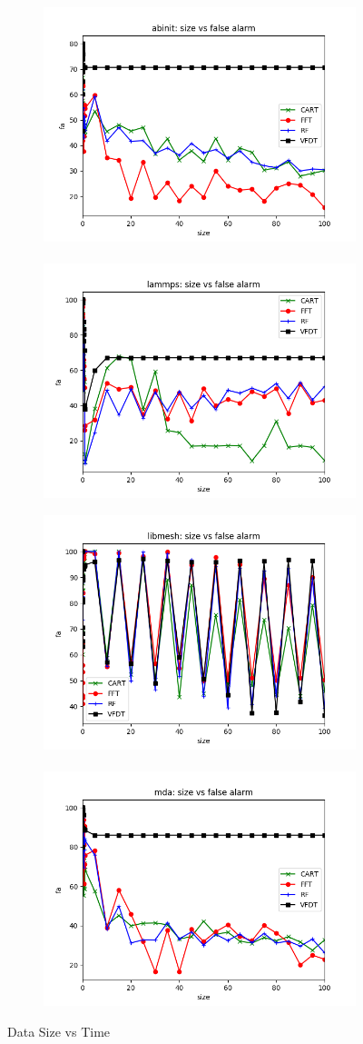 \documentclass[sigplan]{acmart}\settopmatter{printfolios=true,printccs=false,printacmref=false}
\begin{document}
\begin{figure}
	\centering
	\begin{subfigure}[b]{\linewidth}
		\includegraphics[width=.49\linewidth]{fig/abinit-size-fa.png} \ 
		\includegraphics[width=.49\linewidth]{fig/lammps-size-fa.png}
	\end{subfigure}
	\begin{subfigure}[b]{\linewidth}
		\includegraphics[width=.49\linewidth]{fig/libmesh-size-fa.png} \ 
		\includegraphics[width=.49\linewidth]{fig/mda-size-fa.png}
	\end{subfigure}
	
	\caption{Data Size vs Time}\label{fig:fa}
\end{figure}
\end{document}
